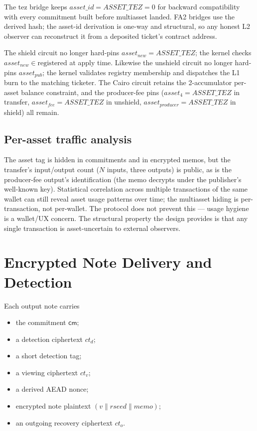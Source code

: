 \documentclass[11pt]{article}
\newcommand{\cm}{\mathsf{cm}}
\begin{document}
The tez bridge keeps \(asset\_id = ASSET\_TEZ = 0\) for backward
compatibility with every commitment built before multiasset landed.
FA2 bridges use the derived hash; the asset-id derivation is one-way
and structural, so any honest L2 observer can reconstruct it from a
deposited ticket's contract address.

The shield circuit no longer hard-pins \(asset_{new} = ASSET\_TEZ\);
the kernel checks \(asset_{new} \in \text{registered}\) at apply time.
Likewise the unshield circuit no longer hard-pins \(asset_{pub}\);
the kernel validates registry membership and dispatches the L1 burn
to the matching ticketer. The Cairo circuit retains the
2-accumulator per-asset balance constraint, and the producer-fee
pins (\(asset_{4} = ASSET\_TEZ\) in transfer, \(asset_{fee} =
ASSET\_TEZ\) in unshield, \(asset_{producer} = ASSET\_TEZ\) in
shield) all remain.

\subsection{Per-asset traffic analysis}

The asset tag is hidden in commitments and in encrypted memos, but
the transfer's input/output count (\(N\) inputs, three outputs) is
public, as is the producer-fee output's identification (the memo
decrypts under the publisher's well-known key). Statistical
correlation across multiple transactions of the same wallet can
still reveal asset usage patterns over time; the multiasset hiding
is per-transaction, not per-wallet. The protocol does not prevent
this — usage hygiene is a wallet/UX concern. The structural
property the design provides is that any single transaction is
asset-uncertain to external observers.

\section{Encrypted Note Delivery and Detection}

Each output note carries

\begin{itemize}
  \item the commitment \(\cm\);
  \item a detection ciphertext \(ct_d\);
  \item a short detection tag;
  \item a viewing ciphertext \(ct_v\);
  \item a derived AEAD nonce;
  \item encrypted note plaintext \((v \parallel rseed \parallel memo)\);
  \item an outgoing recovery ciphertext \(ct_o\).
\end{itemize}
\end{document}
